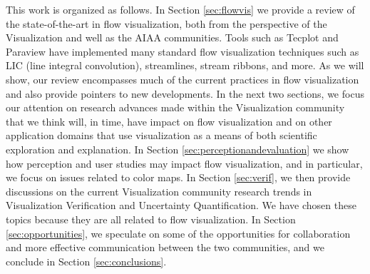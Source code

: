 This work is organized as follows.  In Section \ref{sec:flowvis} we provide a review of the state-of-the-art
in flow visualization, both from the perspective of the Visualization and well as the AIAA communities. 
%
Tools such as Tecplot\cite{amtec1996tecplot} and Paraview\cite{squillacote2007paraview} have implemented many 
standard flow visualization techniques such as LIC (line integral convolution), streamlines, stream ribbons, and more. 
As we will show, our review encompasses much of the current practices in 
flow visualization and also provide pointers to new developments. 
%
In the next two sections, we focus our attention on research advances made within the Visualization 
community that we think will, in time, have impact on flow visualization and on other application domains
that use visualization as a means of both scientific exploration and explanation.  
In Section \ref{sec:perceptionandevaluation} we show how perception and user studies may impact flow visualization, and
in particular, we focus on
issues related to color maps.  In Section \ref{sec:verif}, we then provide
discussions on the current Visualization community research trends in Visualization Verification 
and Uncertainty Quantification.  We have chosen these topics because they are all related to flow visualization.
In Section \ref{sec:opportunities}, we speculate on some of the opportunities for collaboration and
more effective communication between the two communities, and we conclude in Section
\ref{sec:conclusions}.

